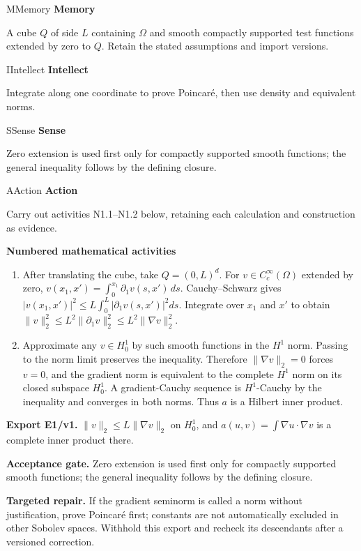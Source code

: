 \documentclass[preprint,12pt,aps,pra,showkeys,amsmath,amssymb,superscriptaddress,floatfix]{revtex4-2}
\theoremstyle{definition}
\theoremstyle{remark}
\newcommand{\mmfaculty}[3]{%
 \begin{mmfacultybox}{#1}{#2}
 {\sffamily\bfseries\color{MMBlue}#2}\par\smallskip #3
 \end{mmfacultybox}}
\newcommand{\field}[2]{\par\smallskip\noindent\textbf{#1.} #2\par}
\begin{document}
\mmfaculty{M}{Memory}{A cube \(Q\) of side \(L\) containing \(\Omega\) and smooth compactly
supported test functions extended by zero to \(Q\). Retain the stated
assumptions and import versions.}

\mmfaculty{I}{Intellect}{Integrate along one coordinate to prove Poincaré, then use density and
equivalent norms.}

\mmfaculty{S}{Sense}{Zero extension is used first only for compactly supported smooth
functions; the general inequality follows by the defining closure.}

\mmfaculty{A}{Action}{Carry out activities N1.1--N1.2 below, retaining each calculation and
construction as evidence.}

\smallskip\noindent\textbf{Numbered mathematical activities}

\begin{enumerate}[label=N1.\arabic*,leftmargin=3.4em]

\item After translating the cube, take \(Q=(0,L)^d\). For
\(v\in C_c^\infty(\Omega)\) extended by zero,
\(v(x_1,x')=\int_0^{x_1}\partial_1v(s,x')\,ds\). Cauchy--Schwarz gives
\(|v(x_1,x')|^2\le L\int_0^L|\partial_1v(s,x')|^2ds\). Integrate over
\(x_1\) and \(x'\) to obtain
\(\|v\|_2^2\le L^2\|\partial_1v\|_2^2\le L^2\|\nabla v\|_2^2\).

\item Approximate any \(v\in H_0^1\) by such smooth functions in the \(H^1\)
norm. Passing to the norm limit preserves the inequality. Therefore
\(\|\nabla v\|_2=0\) forces \(v=0\), and the gradient norm is equivalent
to the complete \(H^1\) norm on its closed subspace \(H_0^1\). A
gradient-Cauchy sequence is \(H^1\)-Cauchy by the inequality and
converges in both norms. Thus \(a\) is a Hilbert inner product.

\end{enumerate}

\field{Export E1/v1}{\(\|v\|_2\le L\|\nabla v\|_2\) on \(H_0^1\), and
\(a(u,v)=\int\nabla u\cdot\nabla v\) is a complete inner product there.}

\field{Acceptance gate}{Zero extension is used first only for compactly supported smooth
functions; the general inequality follows by the defining closure.}

\field{Targeted repair}{If the gradient seminorm is called a norm without justification, prove
Poincaré first; constants are not automatically excluded in other
Sobolev spaces. Withhold this export and recheck its descendants after a
versioned correction.}
\end{document}
